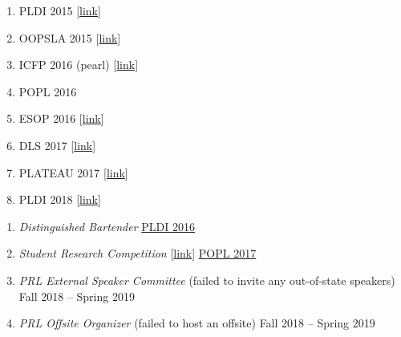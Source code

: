 \documentclass{article}
\begin{document}

\begin{enumerate}
\item PLDI 2015 [\href{http://ccs.neu.edu/home/types/cv/failures/pldi-2015-reject.pdf}{link}]
\item OOPSLA 2015 [\href{http://ccs.neu.edu/home/types/cv/failures/oopsla-2015-reject.pdf}{link}]
\item ICFP 2016 (pearl) [\href{http://ccs.neu.edu/home/types/cv/failures/icfp-2016-reject.pdf}{link}]
\item POPL 2016
\item ESOP 2016 [\href{http://ccs.neu.edu/home/types/resources/type-tailoring.pdf}{link}]
\item DLS 2017 [\href{http://ccs.neu.edu/home/types/resources/dls-2017-reject.pdf}{link}]
\item PLATEAU 2017 [\href{http://ccs.neu.edu/home/types/cv/failures/plateau-2017-reject.pdf}{link}]
\item PLDI 2018 [\href{http://ccs.neu.edu/home/types/cv/failures/pldi-2018-reject.pdf}{link}]
\end{enumerate}

\begin{enumerate}
\item \emph{Distinguished Bartender} \hfill \href{http://conf.researchr.org/home/PLDI-2016}{PLDI 2016}
\item \emph{Student Research Competition} [\href{http://ccs.neu/home/types/cv/failures/src-2017-reject.pdf}{link}] \hfill \href{https://popl17.sigplan.org/track/POPL-2017-src}{POPL 2017}
\item \emph{PRL External Speaker Committee} (failed to invite any out-of-state speakers)  \hfill {Fall 2018 -- Spring 2019}
\item \emph{PRL Offsite Organizer} (failed to host an offsite) \hfill {Fall 2018 -- Spring 2019}
\end{enumerate}
\end{document}
